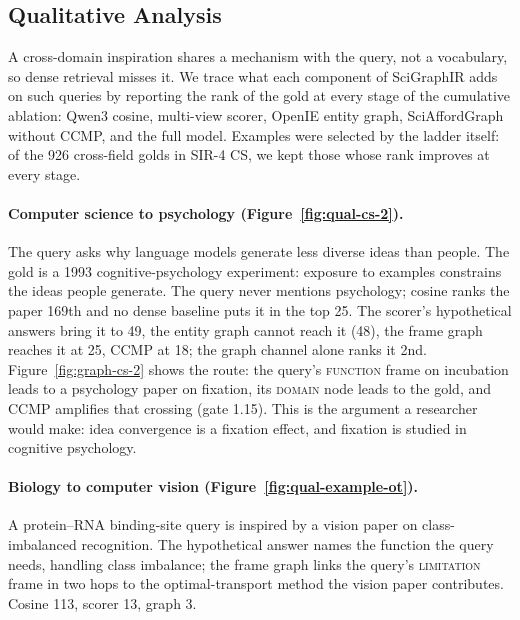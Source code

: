 
\subsection{Qualitative Analysis}
\label{sec:qualitative}

A cross-domain inspiration shares a mechanism with the query, not a vocabulary, so dense retrieval
misses it. We trace what each component of SciGraphIR adds on such queries by reporting the rank of
the gold at every stage of the cumulative ablation: Qwen3 cosine, multi-view scorer, OpenIE entity
graph, SciAffordGraph without CCMP, and the full model. Examples were selected by the ladder itself:
of the 926 cross-field golds in SIR-4 CS, we kept those whose rank improves at every stage.

\paragraph{Computer science to psychology (Figure~\ref{fig:qual-cs-2}).}
The query asks why language models generate less diverse ideas than people. The gold is a 1993
cognitive-psychology experiment: exposure to examples constrains the ideas people generate. The
query never mentions psychology; cosine ranks the paper 169th and no dense baseline puts it in the
top 25. The scorer's hypothetical answers bring it to 49, the entity graph cannot reach it (48), the
frame graph reaches it at 25, CCMP at 18; the graph channel alone ranks it 2nd.
Figure~\ref{fig:graph-cs-2} shows the route: the query's \textsc{function} frame on incubation leads
to a psychology paper on fixation, its \textsc{domain} node leads to the gold, and CCMP amplifies
that crossing (gate 1.15). This is the argument a researcher would make: idea convergence is a
fixation effect, and fixation is studied in cognitive psychology.

\paragraph{Biology to computer vision (Figure~\ref{fig:qual-example-ot}).}
A protein--RNA binding-site query is inspired by a vision paper on class-imbalanced recognition.
The hypothetical answer names the function the query needs, handling class imbalance; the frame graph
links the query's \textsc{limitation} frame in two hops to the optimal-transport method the vision
paper contributes. Cosine 113, scorer 13, graph 3.

